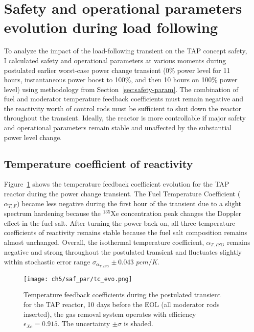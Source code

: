 
\section{Safety and operational parameters evolution during load 
following}\label{ch5:saf_param}
To analyze the impact of the load-following transient on the \gls{TAP} concept 
safety, I calculated safety and operational parameters at various moments 
during postulated earlier worst-case power change transient (0\% power level 
for 11 hours, instantaneous power boost to 100\%, and then 10 hours on 100\% 
power level) using methodology from Section~\ref{sec:safety-param}. The 
combination of fuel and moderator temperature feedback coefficients must 
remain negative and the reactivity worth of control rods must be sufficient to 
shut down the reactor throughout the transient. Ideally, the reactor is more 
controllable if major safety and operational parameters remain stable and 
unaffected by the substantial power level change.

\subsection{Temperature coefficient of reactivity}
Figure~\ref{fig:lf-tap-tc-evo} shows the temperature feedback coefficient 
evolution for the \gls{TAP} reactor during the power change transient. The 
Fuel Temperature Coefficient ($\alpha_{T,F}$) became less negative during the 
first hour of the transient due to a slight spectrum hardening because the  
$^{135}$Xe concentration peak changes the Doppler effect in the fuel salt. 
After turning the power back on, all three temperature coefficients of 
reactivity remains stable because the fuel salt composition remains almost 
unchanged. Overall, the isothermal temperature coefficient, $\alpha_{T,ISO}$ 
remains negative and strong throughout the postulated transient and 
fluctuates slightly within stochastic error range 
$\sigma_{\alpha_{T,ISO}}\pm0.043$ $pcm/K$. 
\begin{figure}[htp!] %
	\centering
	\texttt{[image: ch5/saf\_par/tc\_evo.png]}
	\caption{Temperature feedback coefficients during the postulated 
		transient for the \gls{TAP} reactor, 10 days before the \gls{EOL} (all 
		moderator rods inserted), the gas removal system operates with 
		efficiency $\epsilon_{Xe}=0.915$. The uncertainty $\pm\sigma$ is 
		shaded.}
		\label{fig:lf-tap-tc-evo}
\end{figure}

